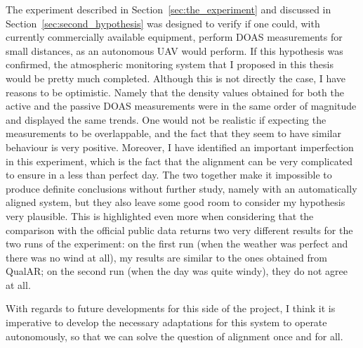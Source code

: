 The experiment described in Section~\ref{sec:the_experiment} and
discussed in Section~\ref{sec:second_hypothesis} was designed to verify
if one could, with currently commercially available equipment, perform
\gls{DOAS} measurements for small distances, as an autonomous \gls{UAV}
would perform. If this hypothesis was confirmed, the atmospheric
monitoring system that I proposed in this thesis would be pretty much
completed. Although this is not directly the case, I have reasons to be
optimistic. Namely that the density values obtained for both the active
and the passive \gls{DOAS} measurements were in the same order of
magnitude and displayed the same trends. One would not be realistic if
expecting the measurements to be overlappable, and the fact that they
seem to have similar behaviour is very positive. Moreover, I have
identified an important imperfection in this experiment, which is the
fact that the alignment can be very complicated to ensure in a less than
perfect day. The two together make it impossible to produce definite
conclusions without further study, namely with an automatically aligned
system, but they also leave some good room to consider my hypothesis
very plausible. This is highlighted even more when considering that the
comparison with the official public data returns two very different
results for the two runs of the experiment: on the first run (when the
weather was perfect and there was no wind at all), my results are
similar to the ones obtained from QualAR; on the second run (when the
day was quite windy), they do not agree at all.

With regards to future developments for this side of the project, I
think it is imperative to develop the necessary adaptations for this
system to operate autonomously, so that we can solve the question of
alignment once and for all.

